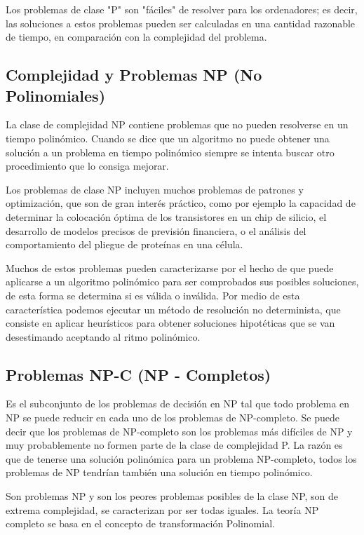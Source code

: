 \documentclass[12pt,twoside]{article}
\begin{document}
 Los problemas de clase "P" son "fáciles" de resolver para los ordenadores; es decir, las soluciones a estos problemas pueden ser calculadas en una cantidad razonable de tiempo, en comparación con la complejidad del problema.

\subsection{Complejidad y Problemas NP (No Polinomiales)}
La clase de complejidad NP contiene problemas que no pueden resolverse en un tiempo polinómico. Cuando se dice que un algoritmo no puede obtener una solución a un problema en tiempo polinómico siempre se intenta buscar otro procedimiento que lo consiga mejorar.

Los problemas de clase NP incluyen muchos problemas de patrones y optimización, que son de gran interés práctico, como por ejemplo la capacidad de determinar la colocación óptima de los transistores en un chip de silicio, el desarrollo de modelos precisos de previsión financiera, o el análisis del comportamiento del pliegue de proteínas en una célula.

Muchos de estos problemas pueden caracterizarse por el hecho de que puede aplicarse a un algoritmo polinómico para ser comprobados sus posibles soluciones, de esta forma se determina si es válida o inválida.
Por medio de esta característica podemos ejecutar un método de resolución no determinista, que consiste en aplicar heurísticos para obtener soluciones hipotéticas que se van desestimando  aceptando al ritmo polinómico.

\subsection{Problemas NP-C (NP - Completos)}
Es el subconjunto de los problemas de decisión en NP tal que todo problema en NP se puede reducir en cada uno de los problemas de NP-completo. Se puede decir que los problemas de NP-completo son los problemas más difíciles de NP y muy probablemente no formen parte de la clase de complejidad P. La razón es que de tenerse una solución polinómica para un problema NP-completo, todos los problemas de NP tendrían también una solución en tiempo polinómico.

Son problemas NP y son los peores problemas posibles de la clase NP, son de extrema complejidad, se caracterizan por ser todas iguales. La teoría NP completo se basa en el concepto de transformación Polinomial.
\end{document}
